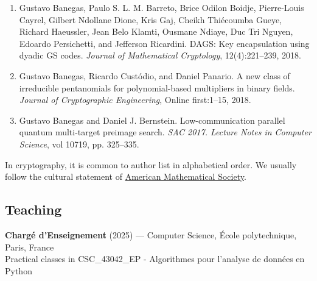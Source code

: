 \begin{enumerate}
\item Gustavo Banegas, Paulo S. L. M. Barreto, Brice Odilon Boidje, Pierre-Louis Cayrel, Gilbert Ndollane Dione, Kris Gaj, Cheikh Thiécoumba Gueye, Richard Haeussler, Jean Belo Klamti, Ousmane Ndiaye, Duc Tri Nguyen, Edoardo Persichetti, and Jefferson Ricardini. DAGS: Key encapsulation using dyadic GS codes. \textit{Journal of Mathematical Cryptology}, 12(4):221–239, 2018.
\item Gustavo Banegas, Ricardo Custódio, and Daniel Panario. A new class of irreducible pentanomials for polynomial-based multipliers in binary fields. \textit{Journal of Cryptographic Engineering}, Online first:1–15, 2018.
\item Gustavo Banegas and Daniel J. Bernstein. Low-communication parallel quantum multi-target preimage search. \textit{SAC 2017. Lecture Notes in Computer Science}, vol 10719, pp. 325–335.
\end{enumerate}
In cryptography, it is common to author list in alphabetical order. We usually follow the cultural statement of \href{https://www.ams.org/profession/leaders/CultureStatement04.pdf}{American Mathematical Society}. 

\subsection*{Teaching}
\textbf{Chargé d'Enseignement } (2025) — Computer Science, École polytechnique, Paris, France~\\
Practical classes in CSC\_43042\_EP - Algorithmes pour l'analyse de données en Python~\\

